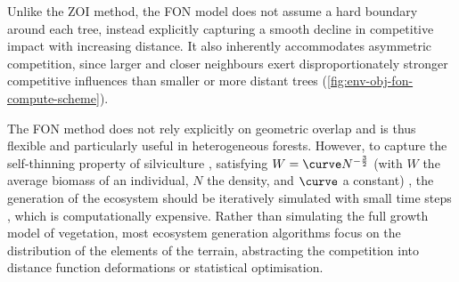 

Unlike the ZOI method, the FON model does not assume a hard boundary around each tree, instead explicitly capturing a smooth decline in competitive impact with increasing distance. It also inherently accommodates asymmetric competition, since larger and closer neighbours exert disproportionately stronger competitive influences than smaller or more distant trees (\cref{fig:env-obj-fon-compute-scheme}).

The FON method does not rely explicitly on geometric overlap and is thus flexible and particularly useful in heterogeneous forests. However, to capture the self-thinning property of silviculture \cite{Makowski2019}, satisfying $W = \curve N^{-\frac{3}{2}}$ (with $W$ the average biomass of an individual, $N$ the density, and $\curve$ a constant) \cite{Westoby1984}, the generation of the ecosystem should be iteratively simulated with small time steps \cite{Alsweis2005}, which is computationally expensive. Rather than simulating the full growth model of vegetation, most ecosystem generation algorithms focus on the distribution of the elements of the terrain, abstracting the competition into distance function deformations or statistical optimisation.

